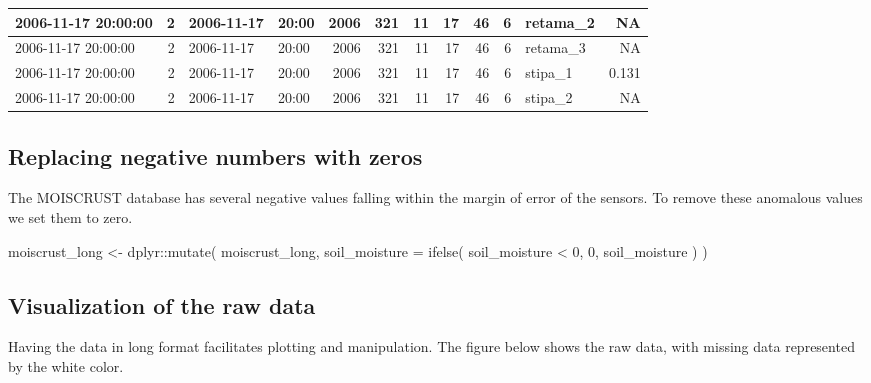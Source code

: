 \documentclass[
  table]{article}
\newenvironment{Shaded}{\begin{snugshade}}{\end{snugshade}}
\newcommand{\AttributeTok}[1]{\textcolor[rgb]{0.77,0.63,0.00}{#1}}
\newcommand{\DecValTok}[1]{\textcolor[rgb]{0.00,0.00,0.81}{#1}}
\newcommand{\FunctionTok}[1]{\textcolor[rgb]{0.00,0.00,0.00}{#1}}
\newcommand{\NormalTok}[1]{#1}
\newcommand{\OtherTok}[1]{\textcolor[rgb]{0.56,0.35,0.01}{#1}}
\newcommand{\SpecialCharTok}[1]{\textcolor[rgb]{0.00,0.00,0.00}{#1}}
\begin{document}
\begin{table}[H]
{\begin{tabular}[t]{l|r|l|l|r|r|r|r|r|r|l|r}
\hline
2006-11-17 20:00:00 & 2 & 2006-11-17 & 20:00 & 2006 & 321 & 11 & 17 & 46 & 6 & retama\_2 & NA\\
\hline
2006-11-17 20:00:00 & 2 & 2006-11-17 & 20:00 & 2006 & 321 & 11 & 17 & 46 & 6 & retama\_3 & NA\\
\hline
2006-11-17 20:00:00 & 2 & 2006-11-17 & 20:00 & 2006 & 321 & 11 & 17 & 46 & 6 & stipa\_1 & 0.131\\
\hline
2006-11-17 20:00:00 & 2 & 2006-11-17 & 20:00 & 2006 & 321 & 11 & 17 & 46 & 6 & stipa\_2 & NA\\
\hline
\end{tabular}}
\end{table}

\hypertarget{replacing-negative-numbers-with-zeros}{%
\subsection{Replacing negative numbers with
zeros}\label{replacing-negative-numbers-with-zeros}}

The MOISCRUST database has several negative values falling within the
margin of error of the sensors. To remove these anomalous values we set
them to zero.

\begin{Shaded}
\begin{Highlighting}[]
\NormalTok{moiscrust\_long }\OtherTok{\textless{}{-}}\NormalTok{ dplyr}\SpecialCharTok{::}\FunctionTok{mutate}\NormalTok{(}
\NormalTok{  moiscrust\_long,}
  \AttributeTok{soil\_moisture =} \FunctionTok{ifelse}\NormalTok{(}
\NormalTok{    soil\_moisture }\SpecialCharTok{\textless{}} \DecValTok{0}\NormalTok{,}
    \DecValTok{0}\NormalTok{,}
\NormalTok{    soil\_moisture}
\NormalTok{  )}
\NormalTok{)}
\end{Highlighting}
\end{Shaded}

\hypertarget{visualization-of-the-raw-data}{%
\subsection{Visualization of the raw
data}\label{visualization-of-the-raw-data}}

Having the data in long format facilitates plotting and manipulation.
The figure below shows the raw data, with missing data represented by
the white color.
\end{document}

